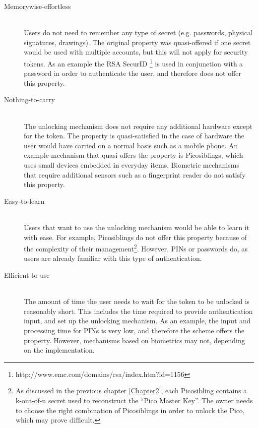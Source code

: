 \begin{description}
  
  \item[Memorywise-effortless] \hfill \\
  Users do not need to remember any type of secret (e.g. passwords, physical signatures, drawings). The original property was quasi-offered if one secret would be used with multiple accounts, but this will not apply for security tokens. As an example the RSA SecurID \footnote{http://www.emc.com/domains/rsa/index.htm?id=1156} is used in conjunction with a password in order to authenticate the user, and therefore does not offer this property.
  
  \item[Nothing-to-carry] \hfill \\
  The unlocking mechanism does not require any additional hardware except for the token. The property is quasi-satisfied in the case of hardware the user would have carried on a normal basis such as a mobile phone. An example mechanism that quasi-offers the property is Picosiblings, which uses small devices embedded in everyday items. Biometric mechanisms that require additional sensors such as a fingerprint reader do not satisfy this property. 
  
  \item[Easy-to-learn] \hfill \\
  Users that want to use the unlocking mechanism would be able to learn it with ease. For example, Picosiblings do not offer this property because of the complexity of their management\footnote{As discussed in the previous chapter \ref{Chapter2}, each Picosibling contains a k-out-of-n secret used to reconstruct the ``Pico Master Key''. The owner needs to choose the right combination of Picosiblings in order to unlock the Pico, which may prove difficult.}. However, PINs or passwords do, as users are already familiar with this type of authentication.
  
  \item[Efficient-to-use] \hfill \\
  The amount of time the user needs to wait for the token to be unlocked is reasonably short. This includes the time required to provide authentication input, and set up the unlocking mechanism. As an example, the input and processing time for PINs is very low, and therefore the scheme offers the property. However, mechanisms based on biometrics may not, depending on the implementation.
  

\end{description}
